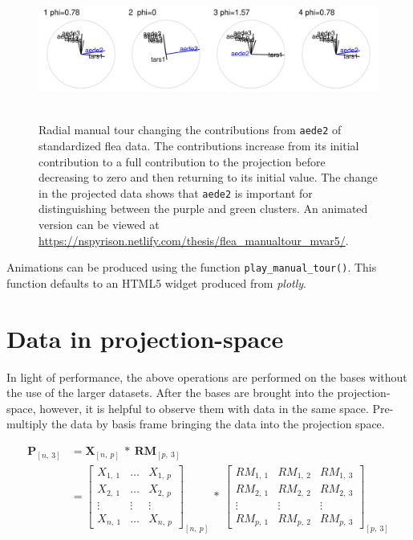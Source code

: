 \documentclass{monashthesis}
\theoremstyle{definition}
\theoremstyle{definition}
\theoremstyle{definition}
\theoremstyle{remark}
\begin{document}
\begin{figure}

{\centering \includegraphics[width=6in,height=1.8in]{./figures/step3} 

}

\caption{Radial manual tour changing the contributions from
\texttt{aede2} of standardized flea data. The contributions increase
from its initial contribution to a full contribution to the projection
before decreasing to zero and then returning to its initial value. The
change in the projected data shows that \texttt{aede2} is important for
distinguishing between the purple and green clusters. An animated
version can be viewed at
\url{https://nspyrison.netlify.com/thesis/flea_manualtour_mvar5/}.}\label{fig:step3}
\end{figure}

Animations can be produced using the function
\texttt{play\_manual\_tour()}. This function defaults to an HTML5 widget
produced from \emph{plotly}.

\section{Data in projection-space}\label{sec:display}

In light of performance, the above operations are performed on the bases
without the use of the larger datasets. After the bases are brought into
the projection-space, however, it is helpful to observe them with data
in the same space. Pre-multiply the data by basis frame bringing the
data into the projection space.

\begin{align}
  \textbf{P}_{[n,~3]}
    &= \textbf{X}_{[n,~p]} ~*~ \textbf{RM}_{[p,~3]} \\
    &=
      \begin{bmatrix}
          X_{1,~1} & \dots & X_{1,~p} \\
          X_{2,~1} & \dots & X_{2,~p} \\
          \vdots   & \vdots & \vdots  \\
          X_{n,~1} & \dots & X_{n,~p}
      \end{bmatrix}_{[n,~p]}
      ~*~
      \begin{bmatrix}
        RM_{1,~1} & RM_{1,~2} & RM_{1,~3} \\
        RM_{2,~1} & RM_{2,~2} & RM_{2,~3} \\
        \vdots     & \vdots     & \vdots  \\
        RM_{p,~1} & RM_{p,~2} & RM_{p,~3}
      \end{bmatrix}_{[p,~3]}
\end{align}
\end{document}
